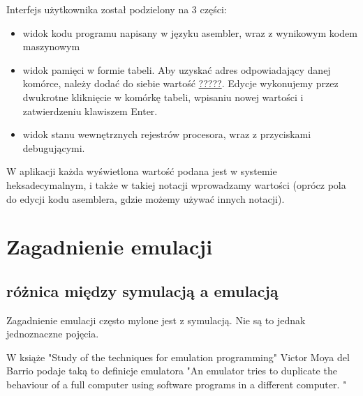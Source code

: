 \documentclass{article}
\begin{document}
	Interfejs użytkownika został podzielony na 3 części: 
	\begin{itemize}  
		\item widok kodu programu napisany w języku asembler, wraz z  wynikowym kodem maszynowym  
		\item widok pamięci w formie tabeli. Aby uzyskać adres odpowiadający danej komórce, należy dodać do siebie wartość \underline{?????}. Edycje wykonujemy przez dwukrotne kliknięcie w komórkę tabeli, wpisaniu nowej wartości i zatwierdzeniu klawiszem Enter.
		\item widok stanu wewnętrznych rejestrów procesora, wraz z przyciskami debugującymi.   
	\end{itemize}
	
	W aplikacji każda wyświetlona wartość podana jest w systemie heksadecymalnym, i także w takiej notacji wprowadzamy wartości (oprócz pola do edycji kodu asemblera, gdzie możemy używać innych notacji).
	
	\section{Zagadnienie emulacji}
	
	\subsection{różnica między symulacją a emulacją} 
	Zagadnienie emulacji często mylone jest z symulacją. Nie są to jednak jednoznaczne pojęcia.
	
	W książe "Study of the techniques for emulation
	programming" Victor Moya del Barrio podaje taką to definicje emulatora "An emulator tries to duplicate the behaviour of a full computer using software programs in a different computer. "\cite{studyofthetechniquesforemulationprogramming}
		
		
		
\end{document}
